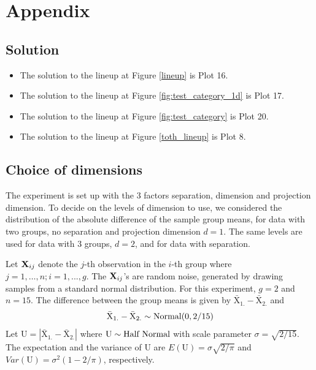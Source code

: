 %



\section*{Appendix}

\subsection*{Solution}
\begin{itemize}
\item The solution to the lineup at Figure \ref{lineup} is Plot 16. 
\item The solution to the lineup at Figure \ref{fig:test_category_1d} is Plot 17.
\item The solution to the lineup at Figure \ref{fig:test_category} is Plot 20.
\item The solution to the lineup at Figure \ref{toth_lineup} is Plot 8.

\end{itemize}

\subsection*{Choice of dimensions} \label{sec:theory}

The experiment is set up with the 3 factors separation, dimension and projection dimension. To decide on the levels of dimension to use, we considered the distribution of the absolute difference of the sample group means, for data with two groups, no separation and projection dimension $d=1$. The same levels are used for data with 3 groups, $d=2$, and for data with separation. 

Let ${\mbox{\boldmath {\bf X}}}_{ij}$ denote the $j$-th observation in the $i$-th group where $j = 1, \dots, n; i=1, ..., g$. The ${\mbox{\boldmath {\bf X}}}_{ij}$'s are random noise, generated by drawing samples from a standard normal distribution. For this experiment, $g = 2$  and $n = 15$. The difference between the group means is given by $\bar{\mbox{X}}_{1.} - \bar{\mbox{X}}_{2.}$%
and $$\bar{\mbox{X}}_{1.} - \bar{\mbox{X}}_{2.} \sim \hbox{Normal}(0, 2/15)$$ Let 
$\mbox{U} = |\bar{\mbox{X}} _{1.} - \bar{\mbox{X}}_{2.}|$ 
where $\mbox{U} \sim \hbox{Half Normal}$ with scale parameter $ \sigma = \sqrt{2/15}$.
The expectation and the variance of $\mbox{U}$ are 
$E(\mbox{U} ) = \sigma \sqrt{2/\pi}$ and 
$Var(\mbox{U}) = \sigma^2 (1 - 2/\pi)$, respectively.

